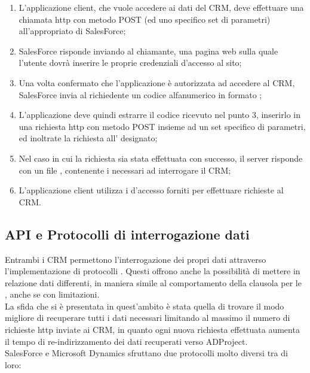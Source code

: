 \documentclass[12pt,a4paper,twoside,openany,english]{book}
\begin{document}
			\begin{enumerate}
				\item L'applicazione client, che vuole accedere ai dati del CRM, deve effettuare una chiamata http con metodo POST (ed uno specifico set di parametri) all'appropriato  di SalesForce;
				\item SalesForce risponde inviando al chiamante, una pagina web sulla quale l'utente dovrà inserire le proprie credenziali d'accesso al sito; %
				\item Una volta confermato che l'applicazione è autorizzata ad accedere al CRM, SalesForce invia al richiedente un codice alfanumerico in formato ;
				\item L'applicazione deve quindi estrarre il codice ricevuto nel punto 3, inserirlo in una richiesta http con metodo POST insieme ad un set specifico di parametri, ed inoltrate la richiesta all' designato;
				\item Nel caso in cui la richiesta sia stata effettuata con successo, il server risponde con un file , contenente i  necessari ad interrogare il CRM;
				\item L'applicazione client utilizza i  d'accesso forniti per effettuare richieste al CRM. 
			\end{enumerate}
		\subsection{API e Protocolli di interrogazione dati}
			Entrambi i CRM permettono l'interrogazione dei propri dati attraverso l'implementazione di protocolli \textit{}. Questi offrono anche la possibilità di mettere in relazione dati differenti, in maniera simile al comportamento della clausola  per le  , anche se con limitazioni.\\ 
			La sfida che si è presentata in quest'ambito è stata quella di trovare il modo migliore di recuperare tutti i dati necessari limitando al massimo il numero di richieste http inviate ai CRM, in quanto ogni nuova richiesta effettuata aumenta il tempo di re-indirizzamento dei dati recuperati verso ADProject.
			~\\
			SalesForce e Microsoft Dynamics sfruttano due protocolli molto diversi tra di loro:
\end{document}
